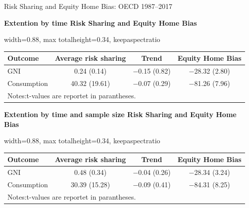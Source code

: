 \documentclass[aspectratio=169, 10pt]{beamer}
\begin{document}
\begin{frame}[t]{Risk Sharing and Equity Home Bias: OECD 1987--2017}
\centering

\begingroup
\scriptsize
\setlength{\tabcolsep}{3pt}
\renewcommand{\arraystretch}{0.85}

\vspace{0.05cm}

{\large \textbf{Extention by time Risk Sharing and Equity Home Bias}}

\vspace{0.10cm}

\begin{adjustbox}{
  width=0.88\textwidth,
  max totalheight=0.34\textheight,
  keepaspectratio
}
\begin{tabular}{lccc}
\hline\hline
Outcome & Average risk sharing & Trend & Equity Home Bias \\
\hline
GNI         
& 0.24 (0.14)   
& $-$0.15 (0.82) 
& $-$28.32 (2.80) \\

Consumption 
& 40.32 (19.61) 
& $-$0.07 (0.29) 
& $-$81.26 (7.96) \\
\hline\hline
  \multicolumn{4}{l}{\footnotesize Notes:t-values are reportet in parantheses.} \\
\end{tabular}
\end{adjustbox}

\vspace{0.35cm}

{\large \textbf{Extention by time and sample size Risk Sharing and Equity Home Bias}}

\vspace{0.10cm}

\begin{adjustbox}{
  width=0.88\textwidth,
  max totalheight=0.34\textheight,
  keepaspectratio
}
\begin{tabular}{lccc}
\hline\hline
Outcome & Average risk sharing & Trend & Equity Home Bias \\
\hline
GNI         
& 0.48 (0.34)   
& $-$0.04 (0.26) 
& $-$28.34 (3.24) \\

Consumption 
& 30.39 (15.28) 
& $-$0.09 (0.41) 
& $-$84.31 (8.25) \\
\hline\hline
  \multicolumn{4}{l}{\footnotesize Notes:t-values are reportet in parantheses.} \\
\end{tabular}
\end{adjustbox}

\endgroup

\end{frame}
\end{document}
